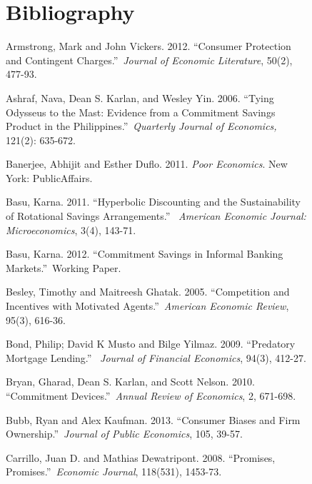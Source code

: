 \documentclass[11pt]{article}%
\begin{document}
\begin{figure}
{\section{Bibliography}

\begin{thebibliography}{99}                                                                                               %


Armstrong, Mark and John Vickers. 2012.
\textquotedblleft Consumer Protection and Contingent
Charges.\textquotedblright\ \textit{Journal of Economic Literature}, 50(2), 477-93.

Ashraf, Nava, Dean S. Karlan, and Wesley Yin. 2006.
\textquotedblleft Tying Odysseus to the Mast: Evidence from a Commitment
Savings Product in the Philippines.\textquotedblright\ \textit{Quarterly
Journal of Economics,} 121(2): 635-672.

Banerjee, Abhijit and Esther Duflo. 2011.
\emph{Poor Economics}. New York: PublicAffairs.

Basu, Karna. 2011. \textquotedblleft Hyperbolic Discounting
and the Sustainability of Rotational Savings Arrangements.\textquotedblright%
\ \textit{American Economic Journal: Microeconomics}, 3(4), 143-71.

\bibitem {}Basu, Karna. 2012. \textquotedblleft Commitment Savings in Informal
Banking Markets.\textquotedblright\ Working Paper.

Besley, Timothy and Maitreesh Ghatak. 2005.
\textquotedblleft Competition and Incentives with Motivated
Agents.\textquotedblright\ \textit{American Economic Review}, 95(3), 616-36.

\bibitem {}Bond, Philip; David K Musto and Bilge Yilmaz. 2009.
\textquotedblleft Predatory Mortgage Lending.\textquotedblright%
\ \textit{Journal of Financial Economics}, 94(3), 412-27.

Bryan, Gharad, Dean S. Karlan, and Scott Nelson.
2010. \textquotedblleft Commitment Devices.\textquotedblright\ \textit{Annual
Review of Economics}, 2, 671-698.

Bubb, Ryan and Alex Kaufman. 2013. \textquotedblleft Consumer
Biases and Firm Ownership.\textquotedblright\ \textit{Journal of Public
Economics}, 105, 39-57.

Carrillo, Juan D. and Mathias Dewatripont. 2008.
\textquotedblleft Promises, Promises.\textquotedblright\ \textit{Economic
Journal}, 118(531), 1453-73.


\end{thebibliography}}
\end{figure}
\end{document}
